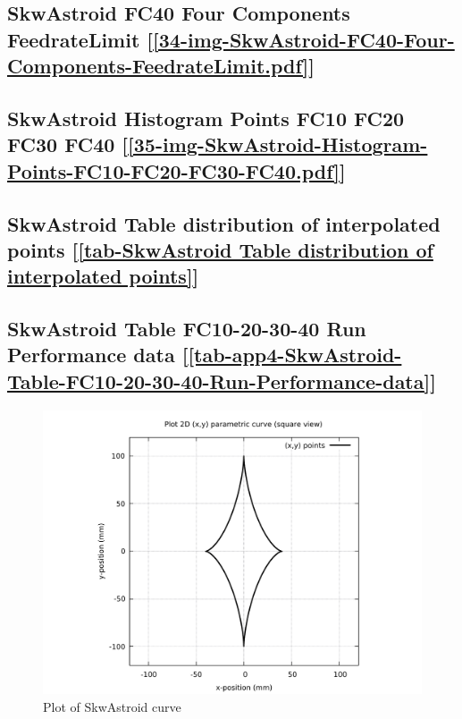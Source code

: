\subsection       {SkwAstroid FC40 Four Components FeedrateLimit
	[\ref      {34-img-SkwAstroid-FC40-Four-Components-FeedrateLimit.pdf}]}
\label{ssec-34-img-SkwAstroid-FC40-Four-Components-FeedrateLimit.pdf}

\subsection       {SkwAstroid Histogram Points FC10 FC20 FC30 FC40
	[\ref      {35-img-SkwAstroid-Histogram-Points-FC10-FC20-FC30-FC40.pdf}] }
\label{ssec-35-img-SkwAstroid-Histogram-Points-FC10-FC20-FC30-FC40.pdf}

\subsection    {SkwAstroid Table distribution of interpolated points
	[\ref      {tab-SkwAstroid Table distribution of interpolated points}] }
\label{ssec-tab-SkwAstroid Table distribution of interpolated points}

\subsection         {SkwAstroid Table FC10-20-30-40 Run Performance data
	[\ref      {tab-app4-SkwAstroid-Table-FC10-20-30-40-Run-Performance-data}] }
\label{ssec-tab-app4-SkwAstroid-Table-FC10-20-30-40-Run-Performance-data}


\clearpage
\pagebreak

\begin{figure}
	\caption     {Plot of SkwAstroid curve}
	\label{01-img-Plot of SkwAstroid curve.pdf}
	\includegraphics[width=1.00\textwidth]{Chap4/appendix/app-SkwAstroid/plots/01-img-Plot of SkwAstroid curve.pdf}
\end{figure}	


